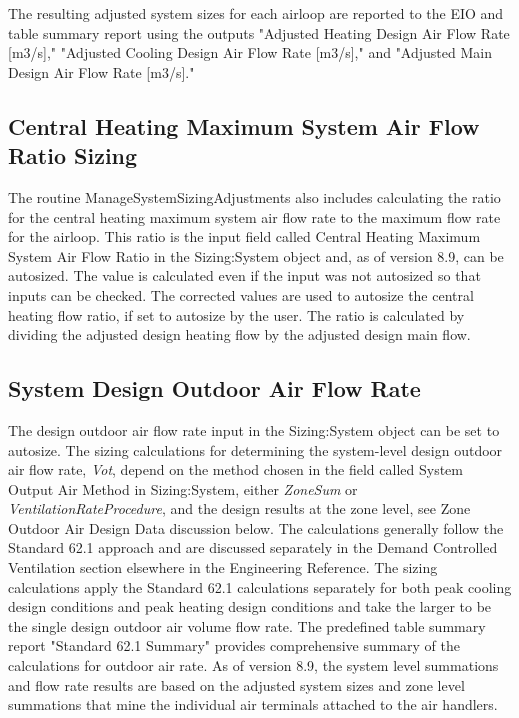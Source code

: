  The resulting adjusted system sizes for each airloop are reported to the EIO and table summary report using the outputs "Adjusted Heating Design Air Flow Rate [m3/s]," "Adjusted Cooling Design Air Flow Rate [m3/s]," and "Adjusted Main Design Air Flow Rate [m3/s]."

\subsection{Central Heating Maximum System Air Flow Ratio Sizing}\label{central-heating-maximum-system-air-flow-ratio-sizing}

The routine ManageSystemSizingAdjustments also includes calculating the ratio for the central heating maximum system air flow rate to the maximum flow rate for the airloop.  This ratio is the input field called Central Heating Maximum System Air Flow Ratio in the Sizing:System object and, as of version 8.9, can be autosized.  The value is calculated even if the input was not autosized so that inputs can be checked.  The corrected values are used to autosize the central heating flow ratio, if set to autosize by the user. The ratio is calculated by dividing the adjusted design heating flow by the adjusted design main flow. 

\subsection{System Design Outdoor Air Flow Rate}\label{Design-Outdoor-Air-Flow-Rate}

The design outdoor air flow rate input in the Sizing:System object can be set to autosize.  The sizing calculations for determining the system-level design outdoor air flow rate, \emph{Vot}, depend on the method chosen in the field called System Output Air Method in Sizing:System, either \emph{ZoneSum} or \emph{VentilationRateProcedure}, and the design results at the zone level, see Zone Outdoor Air Design Data discussion below.  The calculations generally follow the Standard 62.1 approach and are discussed separately in the Demand Controlled Ventilation section elsewhere in the Engineering Reference.  The sizing calculations apply the Standard 62.1 calculations separately for both peak cooling design conditions and peak heating design conditions and take the larger to be the single design outdoor air volume flow rate.  The predefined table summary report "Standard 62.1 Summary" provides comprehensive summary of the calculations for outdoor air rate.  As of version 8.9, the system level summations and flow rate results are based on the adjusted system sizes and zone level summations that mine the individual air terminals attached to the air handlers.



